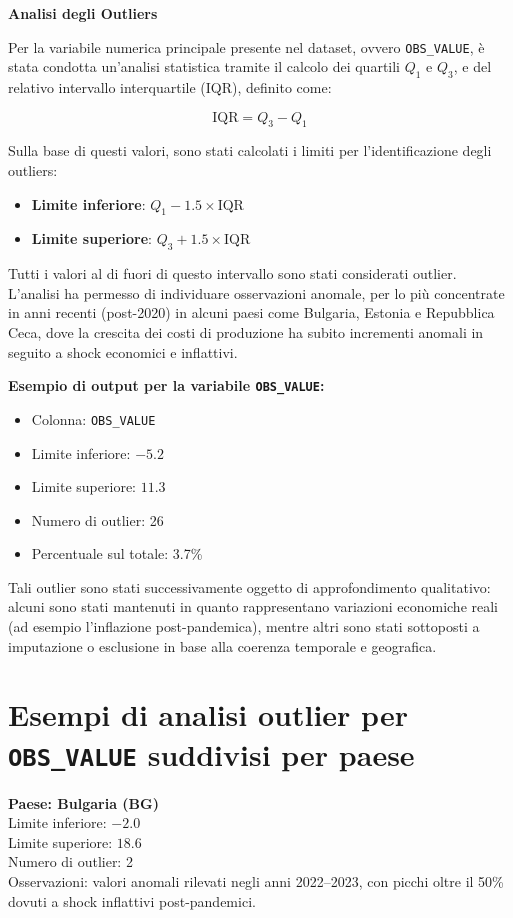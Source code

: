 \documentclass[conference]{IEEEtran}
\begin{document}
\vspace{0.2em}
\vspace{1em} \noindent\textbf{Analisi degli Outliers}


Per la variabile numerica principale presente nel dataset, ovvero \texttt{OBS\_VALUE}, è stata condotta un’analisi statistica tramite il calcolo dei quartili $Q_1$ e $Q_3$, e del relativo intervallo interquartile (IQR), definito come:



\[
\text{IQR} = Q_3 - Q_1
\]



Sulla base di questi valori, sono stati calcolati i limiti per l'identificazione degli outliers:

\begin{itemize}
  \item \textbf{Limite inferiore}: $Q_1 - 1.5 \times \text{IQR}$
  \item \textbf{Limite superiore}: $Q_3 + 1.5 \times \text{IQR}$
\end{itemize}

Tutti i valori al di fuori di questo intervallo sono stati considerati outlier. L’analisi ha permesso di individuare osservazioni anomale, per lo più concentrate in anni recenti (post-2020) in alcuni paesi come Bulgaria, Estonia e Repubblica Ceca, dove la crescita dei costi di produzione ha subito incrementi anomali in seguito a shock economici e inflattivi.

\vspace{0.8em}
\noindent\textbf{Esempio di output per la variabile \texttt{OBS\_VALUE}:}
\begin{itemize}
  \item Colonna: \texttt{OBS\_VALUE}
  \item Limite inferiore: $-5.2$
  \item Limite superiore: $11.3$
  \item Numero di outlier: 26
  \item Percentuale sul totale: 3.7\%
\end{itemize}

Tali outlier sono stati successivamente oggetto di approfondimento qualitativo: alcuni sono stati mantenuti in quanto rappresentano variazioni economiche reali (ad esempio l'inflazione post-pandemica), mentre altri sono stati sottoposti a imputazione o esclusione in base alla coerenza temporale e geografica.

\section*{Esempi di analisi outlier per \texttt{OBS\_VALUE} suddivisi per paese}
\noindent \textbf{Paese: Bulgaria (BG)} \\ Limite inferiore: $-2.0$ \\ Limite superiore: $18.6$ \\ Numero di outlier: 2 \\ Osservazioni: valori anomali rilevati negli anni 2022–2023, con picchi oltre il 50\% dovuti a shock inflattivi post-pandemici.
\end{document}
